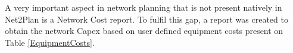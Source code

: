 \documentclass[12pt, a4paper]{article}
\begin{document}
%	
%	
%	
%	
%	
	
	A very important aspect in network planning that is not present natively in Net2Plan is a Network Cost report. To fulfil this gap, a report was created to obtain the network Capex based on user defined equipment costs present on Table \ref{EquipmentCosts}.
		
	\begin{table} [h]
		\centering
		\caption{Equipment Costs}			
		\label{EquipmentCosts}			
	\end{table}
	
\end{document}
